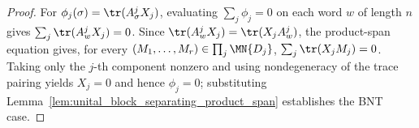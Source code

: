 \begin{proof}
    \leanok
    For $\phi_j(\sigma)=\tr(A^j_\sigma X_j)$, evaluating
    $\sum_j\phi_j=0$ on each word $w$ of length $n$ gives
    $\sum_j\tr(A^j_wX_j)=0$.
    Since $\tr(A^j_wX_j)=\tr(X_jA^j_w)$, the product-span equation gives, for
    every $(M_1,\ldots,M_r)\in\prod_j\MN{D_j}$,
    $\sum_j\tr(X_jM_j)=0$.
    Taking only the $j$-th component nonzero and using nondegeneracy of the
    trace pairing yields $X_j=0$ and hence $\phi_j=0$; substituting
    Lemma~\ref{lem:unital_block_separating_product_span} establishes the BNT
    case.
\end{proof}
